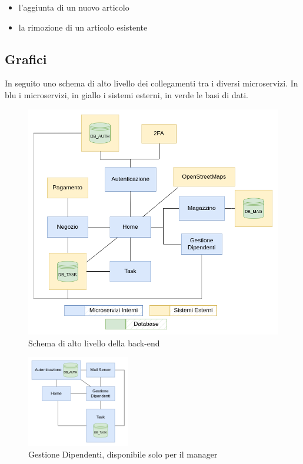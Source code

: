 \documentclass{report}
\begin{document}
\begin{itemize}
	\item l’aggiunta di un nuovo articolo
	
	\item la rimozione di un articolo esistente
\end{itemize}

\subsection{Grafici}

In seguito uno schema di alto livello dei collegamenti tra i diversi microservizi. In blu i microservizi, in giallo i sistemi esterni, in verde le basi di dati.

\begin{figure}[H]
	\includegraphics[width=1\textwidth]{images/back_end_short}
	\caption{Schema di alto livello della back-end}
\end{figure}	

\iffalse
\begin{figure}[H]
	\centering
	\includegraphics[width=0.4\textwidth]{images/admin_back_end}
	\caption{Gestione Dipendenti, disponibile solo per il manager}
\end{figure}
\end{document}
